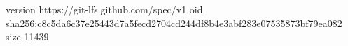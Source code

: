 version https://git-lfs.github.com/spec/v1
oid sha256:c8c5da6c37e25443d7a5fecd2704cd244df8b4e3abf283e07535873bf79ea082
size 11439
